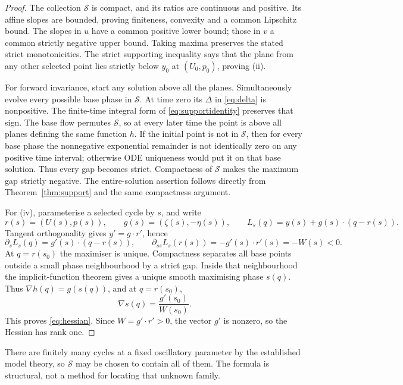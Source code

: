 \documentclass[11pt,a4paper]{article}
\numberwithin{equation}{section}
\theoremstyle{remark}\newtheorem{remark}[theorem]{Remark}
\newcommand{\cS}{\mathcal S}
\begin{document}
\begin{proof}
The collection $\cS$ is compact, and its ratios are continuous and positive. Its affine slopes are bounded, proving finiteness, convexity and a common Lipschitz bound. The slopes in $u$ have a common positive lower bound; those in $v$ a common strictly negative upper bound. Taking maxima preserves the stated strict monotonicities. The strict supporting inequality says that the plane from any other selected point lies strictly below $y_0$ at $(U_0,p_0)$, proving (ii).

For forward invariance, start any solution above all the planes. Simultaneously evolve every possible base phase in $\cS$. At time zero its $\Delta$ in \eqref{eq:delta} is nonpositive. The finite-time integral form of \eqref{eq:supportidentity} preserves that sign. The base flow permutes $\cS$, so at every later time the point is above all planes defining the same function $h$. If the initial point is not in $\cS$, then for every base phase the nonnegative exponential remainder is not identically zero on any positive time interval; otherwise ODE uniqueness would put it on that base solution. Thus every gap becomes strict. Compactness of $\cS$ makes the maximum gap strictly negative. The entire-solution assertion follows directly from Theorem~\ref{thm:support} and the same compactness argument.

For (iv), parameterise a selected cycle by $s$, and write
\[
r(s)=(U(s),p(s)),\qquad g(s)=(\zeta(s),-\eta(s)),\qquad
L_s(q)=y(s)+g(s)\cdot(q-r(s)).
\]
Tangent orthogonality gives $y'=g\cdot r'$, hence
\[
\partial_s L_s(q)=g'(s)\cdot(q-r(s)),\qquad
\partial_{ss}L_s(r(s))=-g'(s)\cdot r'(s)=-W(s)<0.
\]
At $q=r(s_0)$ the maximiser is unique. Compactness separates all base points outside a small phase neighbourhood by a strict gap. Inside that neighbourhood the implicit-function theorem gives a unique smooth maximising phase $s(q)$. Thus $\nabla h(q)=g(s(q))$, and at $q=r(s_0)$,
\[
\nabla s(q)=\frac{g'(s_0)}{W(s_0)}.
\]
This proves \eqref{eq:hessian}. Since $W=g'\cdot r'>0$, the vector $g'$ is nonzero, so the Hessian has rank one.
\end{proof}

There are finitely many cycles at a fixed oscillatory parameter by the established model theory, so $\cS$ may be chosen to contain all of them. The formula is structural, not a method for locating that unknown family.
\end{document}

